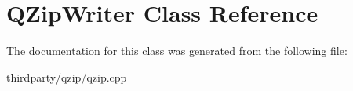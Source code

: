 \hypertarget{class_q_zip_writer}{}\section{Q\+Zip\+Writer Class Reference}
\label{class_q_zip_writer}


The documentation for this class was generated from the following file\+:\begin{DoxyCompactItemize}
\item 
thirdparty/qzip/qzip.\+cpp\end{DoxyCompactItemize}
